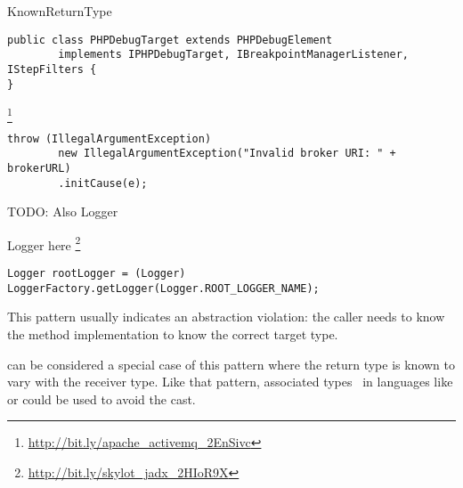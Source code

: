 \begin{pattern}{KnownReturnType}
\begin{verbatim}
public class PHPDebugTarget extends PHPDebugElement
        implements IPHPDebugTarget, IBreakpointManagerListener, IStepFilters {
}
\end{verbatim}

\footnote{\url{http://bit.ly/apache_activemq_2EnSivc}}

\begin{verbatim}
throw (IllegalArgumentException)
        new IllegalArgumentException("Invalid broker URI: " + brokerURL)
        .initCause(e);
\end{verbatim}


TODO: Also Logger

Logger here
\footnote{\url{http://bit.ly/skylot_jadx_2HIoR9X}}

\begin{verbatim}
Logger rootLogger = (Logger) LoggerFactory.getLogger(Logger.ROOT_LOGGER_NAME);
\end{verbatim}


\discussion{}
This pattern usually indicates an abstraction violation: the caller 
needs to know the method implementation to know the correct target type.

   can be considered a special case of this
  pattern where the return type is known to vary with the receiver type.
  Like that pattern, associated types~\cite{chakravartyAssociatedTypeSynonyms2005}
  in languages like \haskell{} or \rust{} 
  could be used to avoid the cast.

\end{pattern}



